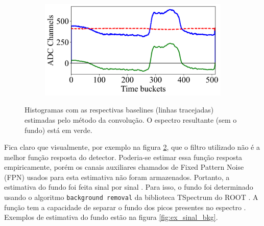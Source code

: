 \documentclass[a4paper,12pt,oneside]{book}
\begin{document}
\begin{figure}[H]
\begin{subfigure}[b]{0.45\textwidth}
        \caption{}
        \label{subfig:bs_fourier_3}
    \end{subfigure}%
    \hfill
    \begin{subfigure}[b]{0.45\textwidth}
        \centering
        \includegraphics[scale=0.42]{figs/bs_fourier_4.png}
        \caption{}
        \label{subfig:bs_fourier_4}
    \end{subfigure}
\caption{Histogramas com as respectivas baselines (linhas tracejadas) estimadas pelo método da convolução. O espectro resultante (sem o fundo) está em verde.}
\label{fig:bs_fourier_exs}
\end{figure}


\par Fica claro que visualmente, por exemplo na figura \ref{subfig:bs_fourier_4}, que o filtro utilizado não é a melhor função resposta do detector. Poderia-se estimar essa função resposta empiricamente, porém os canais auxiliares chamados de Fixed Pattern Noise (FPN) \cite{GET} usados para esta estimativa não foram armazenados. Portanto, a estimativa do fundo foi feita sinal por sinal \cite{FORTINO2022166497, GET}. Para isso, o fundo foi determinado usando o algoritmo \texttt{background removal} da biblioteca TSpectrum do ROOT \cite{root}. A função tem a capacidade de separar o fundo dos picos presentes no espectro \cite{BKG_1, BKG_2, BKG_3}. Exemplos de estimativa do fundo estão na figura \ref{fig:ex_sinal_bkg}.

\end{document}
